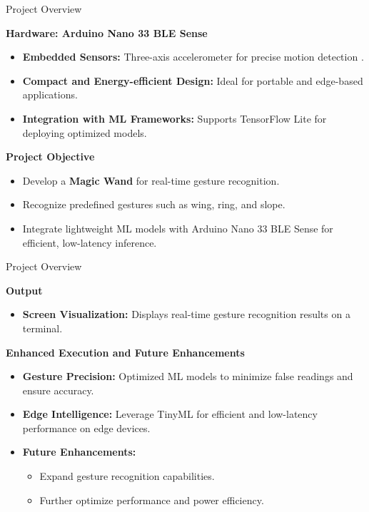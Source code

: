 \begin{frame}{Project Overview}
	\begin{block}{\textbf{Hardware: Arduino Nano 33 BLE Sense}}
		\begin{itemize}
			\item \textbf{Embedded Sensors:} Three-axis accelerometer for precise motion detection \cite{Arduino, 2021}.
			\item \textbf{Compact and Energy-efficient Design:} Ideal for portable and edge-based applications.
			\item \textbf{Integration with ML Frameworks:} Supports TensorFlow Lite for deploying optimized models.
		\end{itemize}
	\end{block}
	
	\begin{block}{\textbf{Project Objective}}
		\begin{itemize}
			\item Develop a \textbf{Magic Wand} for real-time gesture recognition.
			\item Recognize predefined gestures such as wing, ring, and slope.
			\item Integrate lightweight ML models with Arduino Nano 33 BLE Sense for efficient, low-latency inference.
		\end{itemize}
	\end{block}
\end{frame}
\begin{frame}{Project Overview}
	\begin{block}{\textbf{Output}}
		\begin{itemize}
		
			\item \textbf{Screen Visualization:} Displays real-time gesture recognition results on a terminal.
		\end{itemize}
	\end{block}
	
	\begin{block}{\textbf{Enhanced Execution and Future Enhancements}}
		\begin{itemize}
			\item \textbf{Gesture Precision:} Optimized ML models to minimize false readings and ensure accuracy.
			\item \textbf{Edge Intelligence:} Leverage TinyML for efficient and low-latency performance on edge devices.
			\item \textbf{Future Enhancements:}
			\begin{itemize}
				\item Expand gesture recognition capabilities.
				\item Further optimize performance and power efficiency.
					
			\end{itemize}
		\end{itemize}
	\end{block}
\end{frame}



